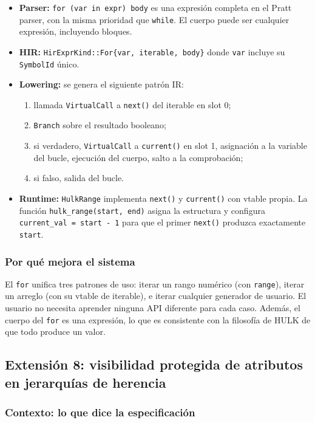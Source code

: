 \documentclass[12pt,letterpaper]{article}
\newcommand{\hulk}{\textsc{HULK}}
\newcommand{\src}[1]{\texttt{#1}}
\begin{document}
\begin{itemize}
    \item \textbf{Parser:} \src{for (var in expr) body} es una expresión completa en el Pratt parser, con la misma prioridad que \src{while}. El cuerpo puede ser cualquier expresión, incluyendo bloques.
    \item \textbf{HIR:} \src{HirExprKind::For\{var, iterable, body\}} donde \src{var} incluye su \src{SymbolId} único.
    \item \textbf{Lowering:} se genera el siguiente patrón IR:
        \begin{enumerate}
            \item llamada \src{VirtualCall} a \src{next()} del iterable en slot 0;
            \item \src{Branch} sobre el resultado booleano;
            \item si verdadero, \src{VirtualCall} a \src{current()} en slot 1, asignación a la variable del bucle, ejecución del cuerpo, salto a la comprobación;
            \item si falso, salida del bucle.
        \end{enumerate}
    \item \textbf{Runtime:} \src{HulkRange} implementa \src{next()} y \src{current()} con vtable propia. La función \src{hulk\_range(start, end)} asigna la estructura y configura \src{current\_val = start - 1} para que el primer \src{next()} produzca exactamente \src{start}.
\end{itemize}

\subsubsection{Por qué mejora el sistema}

El \src{for} unifica tres patrones de uso: iterar un rango numérico (con \src{range}), iterar un arreglo (con su vtable de iterable), e iterar cualquier generador de usuario. El usuario no necesita aprender ninguna API diferente para cada caso. Además, el cuerpo del \src{for} es una expresión, lo que es consistente con la filosofía de \hulk{} de que todo produce un valor.

\subsection{Extensión 8: visibilidad protegida de atributos en jerarquías de herencia}

\subsubsection{Contexto: lo que dice la especificación}
\end{document}

